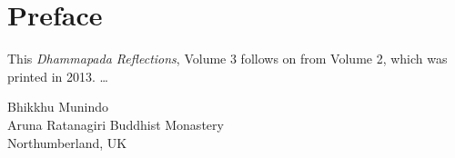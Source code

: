 
\chapter{Preface}

This \emph{Dhammapada Reflections}, Volume 3 follows on from Volume 2, which was printed in 2013. \ldots

{\par\raggedleft
Bhikkhu Munindo\\
Aruna Ratanagiri Buddhist Monastery\\
Northumberland, UK
\par}

